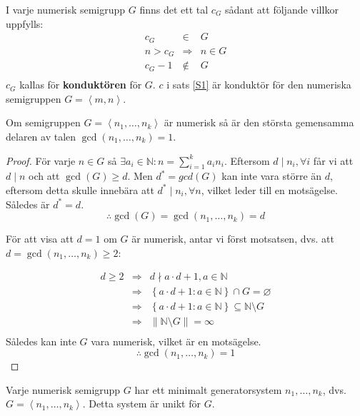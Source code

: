 \begin{Definition}
I varje numerisk semigrupp $G$ finns det ett tal $c_G$ sådant att följande villkor uppfylls:
\[\begin{array}{rcl}
c_G & \in & G \\
n > c_G & \Longrightarrow & n \in G \\
c_G - 1 & \notin & G \\
\end{array}\]
$c_G$ kallas för \textbf{konduktören} för $G$. $c$ i sats \ref{S1} är konduktör för den numeriska semigruppen $G = \left<m, n\right>$.
\end{Definition}

\begin{Theorem}
\label{S2}
Om semigruppen $G = \left<n_1, \ldots, n_k\right>$ är numerisk så är den största gemensamma delaren av talen $\gcd(n_1, \ldots, n_k) = 1$.
\end{Theorem}

\begin{proof}
För varje $n \in G$ så $\exists a_i \in \mathbb{N} : n = \sum_{i=1}^{k} a_i n_i$. Eftersom $d \mid n_i, \forall i$ får vi att $d \mid n$ och att $\gcd(G) \geq d$. Men $d^* = gcd(G)$ kan inte vara större än $d$, eftersom detta skulle innebära att $d^* \mid n_i, \forall n$, vilket leder till en motsägelse. Således är $d^*=d$.
\[\therefore \gcd(G)=\gcd(n_1,\ldots,n_k)=d\] 

För att visa att $d=1$ om $G$ är numerisk, antar vi först motsatsen, dvs. att $d = \gcd(n_1, \ldots, n_k) \geq 2$:

\[\begin{array}{rcl}
d \geq 2 & \Longrightarrow & d \nmid a \cdot d + 1, a \in \mathbb{N} \\
 & \Longrightarrow & \left\{a \cdot d + 1 : a \in \mathbb{N}\right\} \cap G = \varnothing \\
 & \Longrightarrow & \left\{a \cdot d + 1 : a \in \mathbb{N}\right\} \subseteq \mathbb{N} \setminus G \\
 & \Longrightarrow & \left\|\mathbb{N} \setminus G \right\| = \infty \\
\end{array}\]
Således kan inte $G$ vara numerisk, vilket är en motsägelse.
\[\therefore \gcd(n_1, \ldots, n_k) = 1\]
\end{proof}

\begin{Theorem}
\label{S3}
Varje numerisk semigrupp $G$ har ett minimalt generatorsystem $n_1, \ldots, n_k$, dvs. $G = \left<n_1, \ldots, n_k\right>$. Detta system är unikt för $G$.
\end{Theorem}

